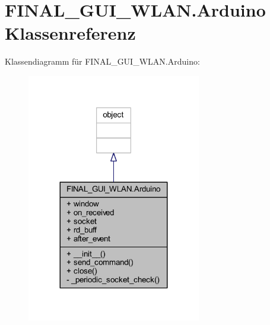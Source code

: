 \hypertarget{class_f_i_n_a_l___g_u_i___w_l_a_n_1_1_arduino}{}\section{F\+I\+N\+A\+L\+\_\+\+G\+U\+I\+\_\+\+W\+L\+A\+N.\+Arduino Klassenreferenz}
\label{class_f_i_n_a_l___g_u_i___w_l_a_n_1_1_arduino}


Klassendiagramm für F\+I\+N\+A\+L\+\_\+\+G\+U\+I\+\_\+\+W\+L\+A\+N.\+Arduino\+:\nopagebreak
\begin{figure}[H]
\begin{center}
\leavevmode
\includegraphics[width=215pt]{class_f_i_n_a_l___g_u_i___w_l_a_n_1_1_arduino__inherit__graph}
\end{center}
\end{figure}


